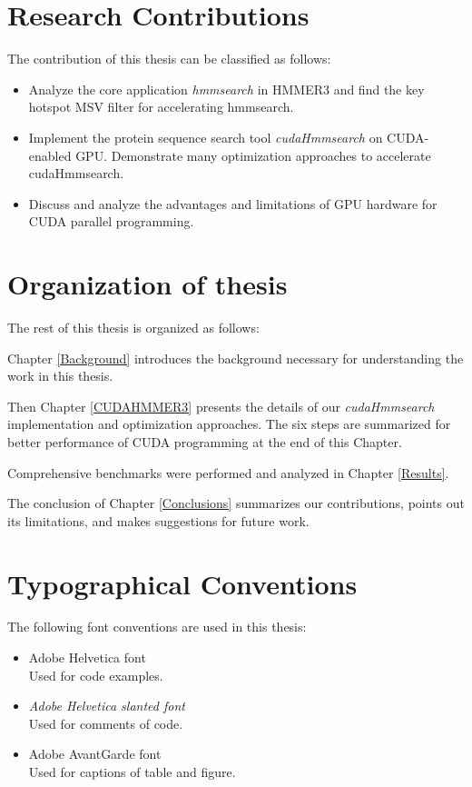 \section{Research Contributions}
The contribution of this thesis can be classified as follows:
\begin{itemize}
 \item Analyze the core application \emph{hmmsearch} in HMMER3 and find the key hotspot MSV filter for accelerating hmmsearch.
 \item Implement the protein sequence search tool \emph{cudaHmmsearch} on CUDA-enabled GPU. Demonstrate many optimization approaches to accelerate cudaHmmsearch.
 \item Discuss and analyze the advantages and limitations of GPU hardware for CUDA parallel programming.
\end{itemize}

\section{Organization of thesis}
The rest of this thesis is organized as follows:

Chapter \ref{Background} introduces the background necessary for understanding the work in this thesis.

Then Chapter \ref{CUDAHMMER3} presents the details of our \emph{cudaHmmsearch} implementation and optimization approaches. The six steps are summarized for better performance of CUDA programming at the end of this Chapter.

Comprehensive benchmarks were performed and analyzed in Chapter \ref{Results}. 

The conclusion of Chapter \ref{Conclusions} summarizes our contributions, points out its limitations, and makes suggestions for future work.

\section{Typographical Conventions}
The following font conventions are used in this thesis:
\begin{itemize}
 \item {\selectfont Adobe Helvetica font}\\
 Used for code examples.
 \item {\selectfont \textsl{Adobe Helvetica slanted font}}\\
 Used for comments of code.
 \item {\selectfont Adobe AvantGarde font}\\
 Used for captions of table and figure.
\end{itemize}
